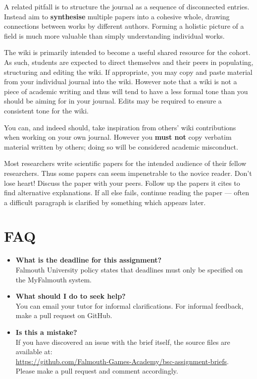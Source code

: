 \documentclass{../fal_assignment}
\begin{document}
A related pitfall is to structure the journal as a sequence of disconnected entries.
Instead aim to \textbf{synthesise} multiple papers into a cohesive whole,
drawing connections between works by different authors.
Forming a holistic picture of a field is much more valuable than simply understanding individual works.

The wiki is primarily intended to become a useful shared resource for the cohort.
As such, students are expected to direct themselves and their peers in populating, structuring and editing the wiki.
If appropriate, you may copy and paste material from your individual journal into the wiki.
However note that a wiki is not a piece of academic writing
and thus will tend to have a less formal tone than you should be aiming for in your journal.
Edits may be required to ensure a consistent tone for the wiki.

You can, and indeed should, take inspiration from others' wiki contributions when working on your own journal.
However you \textbf{must not} copy verbatim material written by others;
doing so will be considered academic misconduct.

Most researchers write scientific papers for the intended audience of their fellow researchers.
Thus some papers can seem impenetrable to the novice reader.
Don't lose heart!
Discuss the paper with your peers.
Follow up the papers it cites to find alternative explanations.
If all else fails, continue reading the paper --- often a difficult paragraph is clarified by something which appears later.

\section*{FAQ}

\begin{itemize}
	\item 	\textbf{What is the deadline for this assignment?} \\ 
    		Falmouth University policy states that deadlines must only be specified on the MyFalmouth system.
    		
	\item 	\textbf{What should I do to seek help?} \\ 
    		You can email your tutor for informal clarifications. For informal feedback, make a pull request on GitHub. 
    		
    	\item 	\textbf{Is this a mistake?} \\ 	
    		If you have discovered an issue with the brief itself, the source files are available at: \\
    		\url{https://github.com/Falmouth-Games-Academy/bsc-assignment-briefs}.\\
    		 Please make a pull request and comment accordingly.
\end{itemize}
\end{document}
